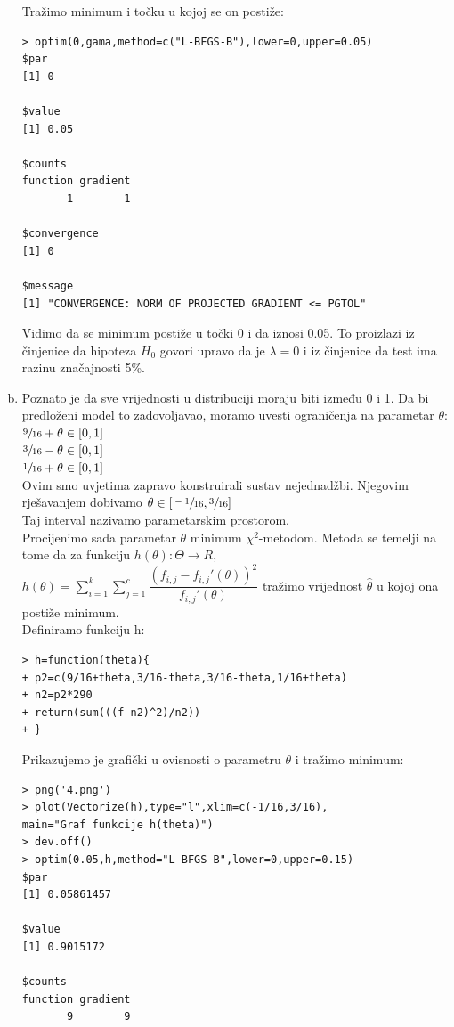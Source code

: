 \documentclass[11pt]{article}
\begin{document}
\begin{enumerate}[(a)]
Tražimo minimum i točku u kojoj se on postiže:
\begin{verbatim}
> optim(0,gama,method=c("L-BFGS-B"),lower=0,upper=0.05)
$par
[1] 0

$value
[1] 0.05

$counts
function gradient 
       1        1 

$convergence
[1] 0

$message
[1] "CONVERGENCE: NORM OF PROJECTED GRADIENT <= PGTOL"
\end{verbatim}
Vidimo da se minimum postiže u točki 0 i da iznosi 0.05. To proizlazi iz činjenice da hipoteza $H_{0}$ govori upravo da je $\lambda=0$ i iz činjenice da test ima razinu značajnosti 5\%.\\
\item Poznato je da sve vrijednosti u distribuciji moraju biti između 0 i 1. Da bi predloženi model to zadovoljavao, moramo uvesti ograničenja na parametar $\theta$:\\
$\sfrac{9}{16} + \theta \in [0,1]$\\
$\sfrac{3}{16} - \theta \in [0,1]$\\
$\sfrac{1}{16} + \theta \in [0,1]$\\
Ovim smo uvjetima zapravo konstruirali sustav nejednadžbi. Njegovim rješavanjem dobivamo $\theta \in [\sfrac{-1}{16}, \sfrac{3}{16}]$\\
Taj interval nazivamo parametarskim prostorom.\\
Procijenimo sada parametar $\theta$ minimum $\chi^2$-metodom. Metoda se temelji na tome da za funkciju $h(\theta):\Theta\rightarrow R$, $h(\theta)=\sum_{i=1}^{k} \sum_{j=1}^{c} \dfrac{(f_{i,j}-f_{i,j}'(\theta))^2}{f_{i,j}'(\theta)}$ tražimo vrijednost $\hat{\theta}$ u kojoj ona postiže minimum.\\
Definiramo funkciju h:
\begin{verbatim}
> h=function(theta){
+ p2=c(9/16+theta,3/16-theta,3/16-theta,1/16+theta)
+ n2=p2*290
+ return(sum(((f-n2)^2)/n2))
+ }
\end{verbatim}
Prikazujemo je grafički u ovisnosti o parametru $\theta$ i tražimo minimum:
\begin{verbatim}
> png('4.png')
> plot(Vectorize(h),type="l",xlim=c(-1/16,3/16),
main="Graf funkcije h(theta)")
> dev.off()
> optim(0.05,h,method="L-BFGS-B",lower=0,upper=0.15)
$par
[1] 0.05861457

$value
[1] 0.9015172

$counts
function gradient 
       9        9 


\end{verbatim}
\end{enumerate}
\end{document}
